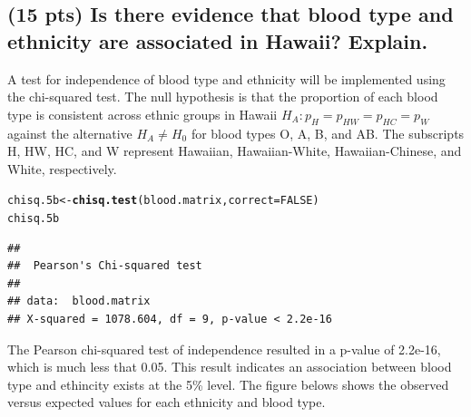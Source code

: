 \documentclass{article}\usepackage[]{graphicx}\usepackage[]{color}
\makeatletter
\newcommand{\hlnum}[1]{\textcolor[rgb]{0.686,0.059,0.569}{#1}}%
\newcommand{\hlstd}[1]{\textcolor[rgb]{0.345,0.345,0.345}{#1}}%
\newcommand{\hlkwb}[1]{\textcolor[rgb]{0.69,0.353,0.396}{#1}}%
\newcommand{\hlkwc}[1]{\textcolor[rgb]{0.333,0.667,0.333}{#1}}%
\newcommand{\hlkwd}[1]{\textcolor[rgb]{0.737,0.353,0.396}{\textbf{#1}}}%
\newenvironment{kframe}{%
 \def\at@end@of@kframe{}%
 \ifinner\ifhmode%
  \def\at@end@of@kframe{\end{minipage}}%
  \begin{minipage}{\columnwidth}%
 \fi\fi%
 \def\FrameCommand##1{\hskip\@totalleftmargin \hskip-\fboxsep
 \colorbox{shadecolor}{##1}\hskip-\fboxsep
     \hskip-\linewidth \hskip-\@totalleftmargin \hskip\columnwidth}%
 \MakeFramed {\advance\hsize-\width
   \@totalleftmargin\z@ \linewidth\hsize
   \@setminipage}}%
 {\par\unskip\endMakeFramed%
 \at@end@of@kframe}
\newenvironment{knitrout}{}{} %
\makeatother
\begin{document}
\subsection{(15 pts) Is there evidence that blood type and ethnicity are associated in Hawaii? Explain.}
A test for independence of blood type and ethnicity will be implemented using the chi-squared test. The null hypothesis is that the proportion of  each blood type is consistent across ethnic groups in Hawaii $H_A: p_H = p_{HW} = p_{HC} = p_W$ against the alternative $H_A \ne H_0$ for blood types O, A, B, and AB.  The subscripts H, HW, HC, and W represent Hawaiian, Hawaiian-White, Hawaiian-Chinese, and White, respectively.

\begin{knitrout}
\color{fgcolor}\begin{kframe}
\begin{alltt}
\hlstd{chisq.5b} \hlkwb{<-} \hlkwd{chisq.test}\hlstd{(blood.matrix,} \hlkwc{correct} \hlstd{=} \hlnum{FALSE}\hlstd{)}
\hlstd{chisq.5b}
\end{alltt}
\begin{verbatim}
## 
## 	Pearson's Chi-squared test
## 
## data:  blood.matrix
## X-squared = 1078.604, df = 9, p-value < 2.2e-16
\end{verbatim}
\end{kframe}
\end{knitrout}

The Pearson chi-squared test of independence resulted in a p-value of 2.2e-16, which is much less that 0.05.  This result indicates an association between blood type and ethincity exists at the 5\% level.  The figure belows shows the observed versus expected values for each ethnicity and blood type.
\end{document}
